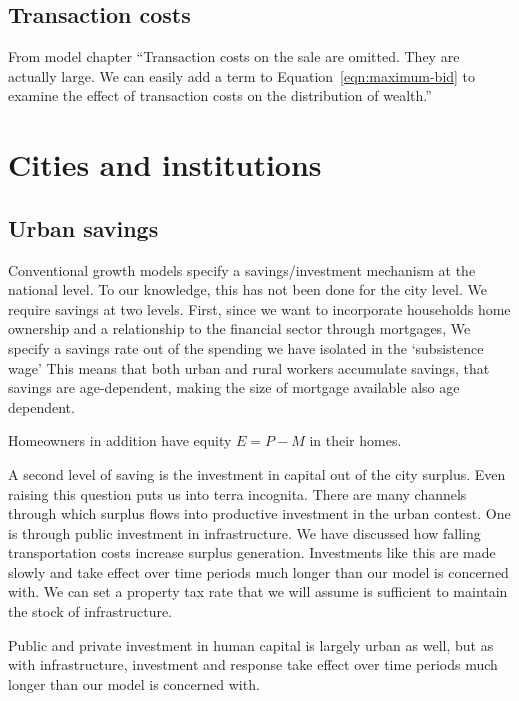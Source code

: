 \subsection{Transaction costs}
From model chapter ``Transaction costs on the sale are omitted. They are actually large. We can easily add a term to  Equation~\ref{eqn:maximum-bid} to examine the effect of transaction costs on the distribution of wealth.''

\section{Cities and institutions}
\subsection{Urban savings}

Conventional growth models specify a savings/investment mechanism at the national level. To our knowledge, this has not been done for the city level. We require  savings at two levels. First, since we want to incorporate  households home ownership and a relationship to the financial sector through mortgages, We specify a savings rate out of the spending we have isolated in the `subsistence wage' This means that both urban and rural workers accumulate savings, that savings are age-dependent, making the size of mortgage available also age dependent. 

Homeowners in addition have equity $E=P-M$ in their homes. %

A second level of saving is the  investment in capital out of the city surplus. Even raising this question puts us into terra incognita. There are many  channels through which surplus flows into productive investment in the urban contest. One is through public investment in infrastructure. We have discussed how falling transportation costs increase surplus generation. Investments like this are made slowly and take effect over time periods much longer than our model is concerned with.  We can set a property tax rate   that we will assume is sufficient to maintain the stock of infrastructure.

Public and private investment in human capital is largely urban as well, but as with infrastructure, investment and response take effect over time periods much longer than our model is concerned with. 

